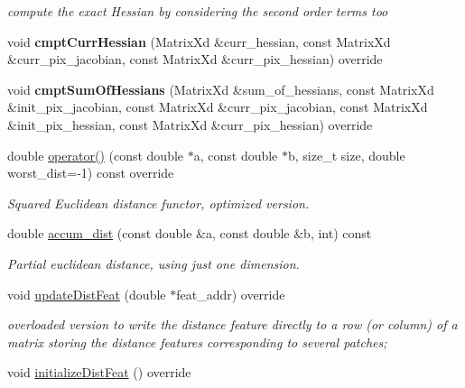 \begin{DoxyCompactItemize}
\begin{DoxyCompactList}\small\item\em compute the exact Hessian by considering the second order terms too \end{DoxyCompactList}\item 
\hypertarget{classSSDBase_ac2dc4f6b27a3a7f8ff25bbd88e5f79f9}{void {\bfseries cmpt\-Curr\-Hessian} (Matrix\-Xd \&curr\-\_\-hessian, const Matrix\-Xd \&curr\-\_\-pix\-\_\-jacobian, const Matrix\-Xd \&curr\-\_\-pix\-\_\-hessian) override}\label{classSSDBase_ac2dc4f6b27a3a7f8ff25bbd88e5f79f9}

\item 
\hypertarget{classSSDBase_a5f93e0c21009f6ed26033370935e1485}{void {\bfseries cmpt\-Sum\-Of\-Hessians} (Matrix\-Xd \&sum\-\_\-of\-\_\-hessians, const Matrix\-Xd \&init\-\_\-pix\-\_\-jacobian, const Matrix\-Xd \&curr\-\_\-pix\-\_\-jacobian, const Matrix\-Xd \&init\-\_\-pix\-\_\-hessian, const Matrix\-Xd \&curr\-\_\-pix\-\_\-hessian) override}\label{classSSDBase_a5f93e0c21009f6ed26033370935e1485}

\item 
double \hyperlink{classSSDBase_a30b23be6b152097089492a3acf42379d}{operator()} (const double $\ast$a, const double $\ast$b, size\-\_\-t size, double worst\-\_\-dist=-\/1) const override
\begin{DoxyCompactList}\small\item\em Squared Euclidean distance functor, optimized version. \end{DoxyCompactList}\item 
double \hyperlink{classSSDBase_ac8fa8b880846facc761c1fba0ab05b42}{accum\-\_\-dist} (const double \&a, const double \&b, int) const 
\begin{DoxyCompactList}\small\item\em Partial euclidean distance, using just one dimension. \end{DoxyCompactList}\item 
\hypertarget{classSSDBase_ac3598ec0f4efc0db45890459d3ca2532}{void \hyperlink{classSSDBase_ac3598ec0f4efc0db45890459d3ca2532}{update\-Dist\-Feat} (double $\ast$feat\-\_\-addr) override}\label{classSSDBase_ac3598ec0f4efc0db45890459d3ca2532}

\begin{DoxyCompactList}\small\item\em overloaded version to write the distance feature directly to a row (or column) of a matrix storing the distance features corresponding to several patches; \end{DoxyCompactList}\item 
\hypertarget{classSSDBase_a62a4b70ee7ada9d265db6ead6a690d42}{void \hyperlink{classSSDBase_a62a4b70ee7ada9d265db6ead6a690d42}{initialize\-Dist\-Feat} () override}\label{classSSDBase_a62a4b70ee7ada9d265db6ead6a690d42}


\end{DoxyCompactItemize}
